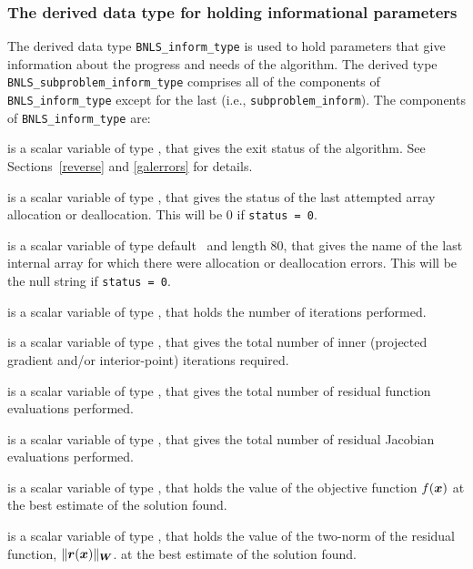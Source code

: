 \documentclass{galahad}
\newcommand{\packagename}{BNLS}
\begin{document}

\subsubsection{The derived data type for holding informational
 parameters}\label{typeinform}
The derived data type
{\tt \packagename\_inform\_type}
is used to hold parameters that give information about the progress and needs
of the algorithm.
The derived type {\tt \packagename\_subproblem\_inform\_type}
comprises all of the components of {\tt \packagename\_inform\_type}
except for the last (i.e., {\tt subproblem\_inform}).
The components of
{\tt \packagename\_inform\_type}
are:

\begin{description}
 is a scalar variable of type \integer, that gives the
exit status of the algorithm.
See Sections~\ref{reverse} and \ref{galerrors}
for details.

 is a scalar variable of type \integer, that gives
the status of the last attempted array allocation or deallocation.
This will be 0 if {\tt status = 0}.

 is a scalar variable of type default \character\
and length 80, that  gives the name of the last internal array
for which there were allocation or deallocation errors.
This will be the null string if {\tt status = 0}.

 is a scalar variable of type \integer, that holds the
number of iterations performed.

 is a scalar variable of type \integer, that gives the
total number of inner (projected gradient and/or interior-point) iterations 
required.

 is a scalar variable of type \integer, that gives the
total number of residual function evaluations performed.

 is a scalar variable of type \integer, that gives the
total number of residual Jacobian evaluations performed.

 is a scalar variable of type \realdp, that holds the
value of the objective function $f({\bm{x}})$  at the best estimate
of the solution found.

 is a scalar variable of type \realdp, that holds the
value of the two-norm of the residual function, $\|{\bm{r}}({\bm{x}})\|_{{\bm{W}}}$.
at the best estimate of the solution found.


\end{description}
\end{document}
